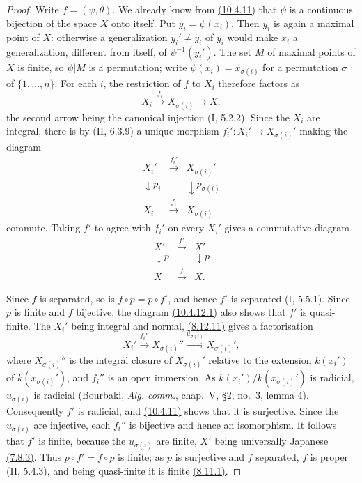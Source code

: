 \begin{proof}
Write $f=(\psi,\theta)$.  We already know from {\hyperref[IV.10.4.11]{(10.4.11)}} that $\psi$ is
a continuous bijection of the space $X$ onto itself.  Put
$y_i=\psi(x_i)$.  Then $y_i$ is again a maximal point of $X$: otherwise
a generalization $y_i'\neq y_i$ of $y_i$ would make $x_i$ a
generalization, different from itself, of $\psi^{-1}(y_i')$.  The set
$M$ of maximal points of $X$ is finite, so $\psi|M$ is a permutation;
write $\psi(x_i)=x_{\sigma(i)}$ for a permutation $\sigma$ of
$\{1,\ldots,n\}$.  For each $i$, the restriction of $f$ to $X_i$
therefore factors as
\[
 X_i\xrightarrow{f_i}X_{\sigma(i)}\longrightarrow X,
\]
the second arrow being the canonical injection (I, 5.2.2).  Since the
$X_i$ are integral, there is by (II, 6.3.9) a unique morphism
$f_i':X_i'\to X_{\sigma(i)}'$ making the diagram
\[
\begin{array}{ccc}
X_i'&\xrightarrow{f_i'}&X_{\sigma(i)}'\\
\downarrow p_i&&\downarrow p_{\sigma(i)}\\
X_i&\xrightarrow{f_i}&X_{\sigma(i)}
\end{array}
\]
commute.  Taking $f'$ to agree with $f_i'$ on every $X_i'$ gives a
commutative diagram
\begin{equation}
\label{IV.10.4.12.1.errata}
\begin{array}{ccc}
X'&\xrightarrow{f'}&X'\\
\downarrow p&&\downarrow p\\
X&\xrightarrow{f}&X.
\end{array}
\tag{10.4.12.1}
\end{equation}

Since $f$ is separated, so is $f\circ p=p\circ f'$, and hence $f'$ is
separated (I, 5.5.1).  Since $p$ is finite and $f$ bijective, the
diagram {\hyperref[IV.10.4.12.1]{(10.4.12.1)}} also shows that $f'$ is quasi-finite.  The
$X_i'$ being integral and normal, {\hyperref[IV.8.12.11]{(8.12.11)}} gives a factorisation
\[
 X_i'\xrightarrow{f_i''}X_{\sigma(i)}''
 \xrightarrow{u_{\sigma(i)}}X_{\sigma(i)}',
\]
where $X_{\sigma(i)}''$ is the integral closure of
$X_{\sigma(i)}'$ relative to the extension $k(x_i')$ of
$k(x_{\sigma(i)}')$, and $f_i''$ is an open immersion.  As
$k(x_i')/k(x_{\sigma(i)}')$ is radicial, $u_{\sigma(i)}$ is radicial
(Bourbaki, \emph{Alg. comm.}, chap.~V, \S2, no.~3, lemma 4).
Consequently $f'$ is radicial, and {\hyperref[IV.10.4.11]{(10.4.11)}} shows that it is
surjective.  Since the $u_{\sigma(i)}$ are injective, each $f_i''$ is
bijective and hence an isomorphism.  It follows that $f'$ is finite,
because the $u_{\sigma(i)}$ are finite, $X'$ being universally
Japanese {\hyperref[IV.7.8.3]{(7.8.3)}}.  Thus $p\circ f'=f\circ p$ is finite; as $p$ is
surjective and $f$ separated, $f$ is proper (II, 5.4.3), and being
quasi-finite it is finite {\hyperref[IV.8.11.1]{(8.11.1)}}.


\end{proof}
